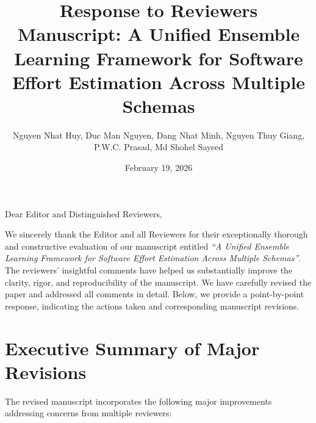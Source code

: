 \documentclass[11pt,a4paper]{article}
\title{\textbf{Response to Reviewers}\\[0.5em]
\large Manuscript: A Unified Ensemble Learning Framework for Software Effort Estimation Across Multiple Schemas}
\author{Nguyen Nhat Huy, Duc Man Nguyen, Dang Nhat Minh, Nguyen Thuy Giang,\\
P.W.C. Prasad, Md Shohel Sayeed}
\date{February 19, 2026}
\begin{document}
\pagestyle{empty} %

\maketitle

\noindent Dear Editor and Distinguished Reviewers,

We sincerely thank the Editor and all Reviewers for their exceptionally thorough and constructive evaluation of our manuscript entitled \textit{``A Unified Ensemble Learning Framework for Software Effort Estimation Across Multiple Schemas''}. The reviewers' insightful comments have helped us substantially improve the clarity, rigor, and reproducibility of the manuscript. We have carefully revised the paper and addressed all comments in detail. Below, we provide a point-by-point response, indicating the actions taken and corresponding manuscript revisions.

\section*{Executive Summary of Major Revisions}

The revised manuscript incorporates the following major improvements addressing concerns from multiple reviewers:
\end{document}

